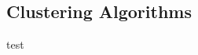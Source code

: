 \documentclass{article}[12pt]
\numberwithin{equation}{section}
\begin{document}
\begin{multicols}{2}

\begin{flushleft}

\section{Clustering Algorithms}


test





\end{flushleft}
\end{multicols}












































\end{document}

